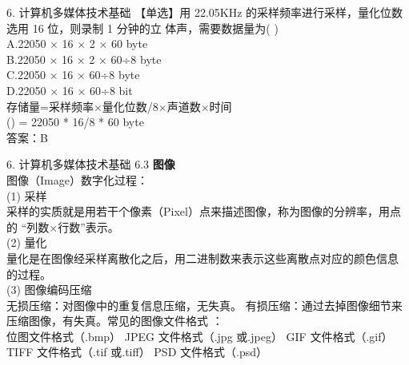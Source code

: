 \documentclass[aspectratio=169]{beamer}
\begin{document}
\begin{frame}[t]{6. 计算机多媒体技术基础} \vspace{20pt}
【单选】用 22.05KHz 的采样频率进行采样，量化位数选用 16 位，则录制 1 分钟的立
体声，需要数据量为( )\\
A.22050 × 16 × 2 × 60 byte\\
B.22050 × 16 × 2 × 60÷8 byte\\
C.22050 × 16 × 60÷8 byte\\
D.22050 × 16 × 60÷8 bit\\
存储量=采样频率×量化位数/8×声道数×时间\\
    () = 22050 * 16/8 * 60 byte\\
答案：B\\
\end{frame}




\begin{frame}[t]{6. 计算机多媒体技术基础} \vspace{20pt}
    6.3 \textbf{图像}\\
    图像（Image）数字化过程：\\

    (1) 采样\\
采样的实质就是用若干个像素（Pixel）点来描述图像，称为图像的分辨率，用点的
“列数×行数”表示。\\

(2) 量化\\
量化是在图像经采样离散化之后，用二进制数来表示这些离散点对应的颜色信息
的过程。\\
(3) 图像编码压缩\\
无损压缩：对图像中的重复信息压缩，无失真。
有损压缩：通过去掉图像细节来压缩图像，有失真。常见的图像文件格式 ：\\
位图文件格式（.bmp）
JPEG 文件格式（.jpg 或.jpeg）
GIF 文件格式（.gif）
TIFF 文件格式（.tif 或.tiff）
PSD 文件格式（.psd）\\


\end{frame}
\end{document}
